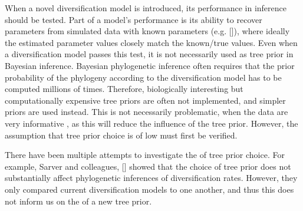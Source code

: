 When a novel diversification model is introduced,
its performance in inference should be tested.
Part of a model's performance is its ability to 
recover parameters from simulated data with known 
parameters (e.g. [\cite{etienne2014estimating}]), 
where ideally the estimated parameter values closely match the known/true values.
Even when a diversification model passes this test, 
it is not necessarily used as tree prior in Bayesian inference.
Bayesian phylogenetic inference often requires 
that the prior probability of the phylogeny 
according to the diversification model has to be computed millions of times. 
Therefore, biologically interesting but computationally expensive tree priors 
are often not implemented, and simpler priors are used instead. 
This is not necessarily problematic, when the data are very informative 
, 
as this will reduce the influence of the tree prior.
However, the assumption that tree prior choice is of low  
must first be verified.

There have been multiple attempts to investigate the  of tree
prior choice. For example, Sarver and colleagues, [\cite{sarver2019choice}] 
showed that the choice of tree prior does not 
substantially affect phylogenetic inferences of diversification rates.
However, they only compared current diversification models to one another, 
and thus this does not inform us on the  of a new tree prior.



